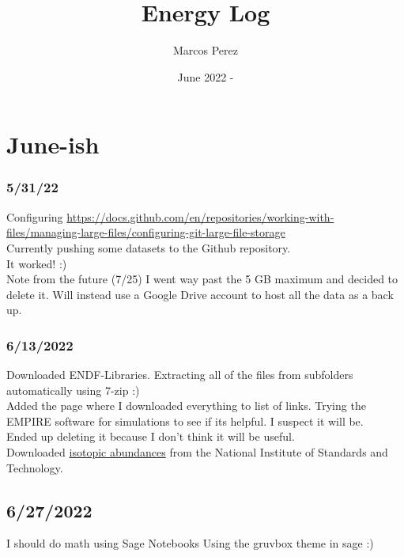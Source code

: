 \documentclass[12pt]{article}
\title{Energy Log}
\author{Marcos Perez}
\date{June 2022 - }
\begin{document}
\maketitle

\section{June-ish}
\subsubsection{5/31/22}
Configuring \href{https://docs.github.com/en/repositories/working-with-files/managing-large-files/configuring-git-large-file-storage}{https://docs.github.com/en/repositories/working-with-files/managing-large-files/configuring-git-large-file-storage}\\
Currently pushing some datasets to the Github repository. \\
It worked! :)\\
Note from the future (7/25) I went way past the 5 GB maximum and decided to delete it. Will instead use a Google Drive account to host all the data as a back up.
\subsubsection{6/13/2022}
Downloaded ENDF-Libraries. Extracting all of the files from subfolders automatically using 7-zip :)\\
Added the page where I downloaded everything to list of links. Trying the EMPIRE software for simulations to see if its helpful. I suspect it will be. \\
Ended up deleting it because I don't think it will be useful. \\
Downloaded \href{https://www.nist.gov/pml/atomic-weights-and-isotopic-compositions-relative-atomic-masses}{isotopic abundances} from the National Institute of Standards and Technology. 
\subsection{6/27/2022}
I should do math using Sage Notebooks Using the gruvbox theme in sage :) \\
\end{document}
